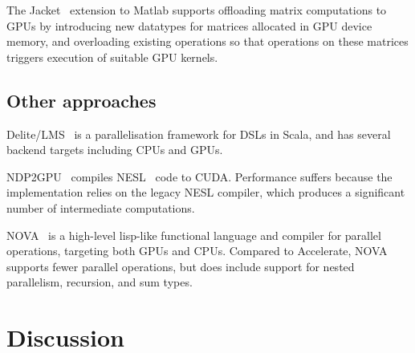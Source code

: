 The Jacket~\cite{AccelerEyes:vq} extension to Matlab supports offloading matrix
computations to GPUs by introducing new datatypes for matrices allocated in GPU
device memory, and overloading existing operations so that operations on these
matrices triggers execution of suitable GPU kernels.


\subsection{Other approaches}

Delite/LMS~\cite{Rompf:2013er} is a parallelisation framework for DSLs in Scala,
and has several backend targets including CPUs and GPUs.

NDP2GPU~\cite{Bergstrom:2012bi} compiles NESL~\cite{Blelloch:1995ut} code to
CUDA. Performance suffers because the implementation relies on the legacy NESL
compiler, which produces a significant number of intermediate computations.

NOVA~\cite{Collins:2013wn} is a high-level lisp-like functional language and
compiler for parallel operations, targeting both GPUs and CPUs. Compared to
Accelerate, NOVA supports fewer parallel operations, but does include support
for nested parallelism, recursion, and sum types.


\section{Discussion}


%
%


% 




